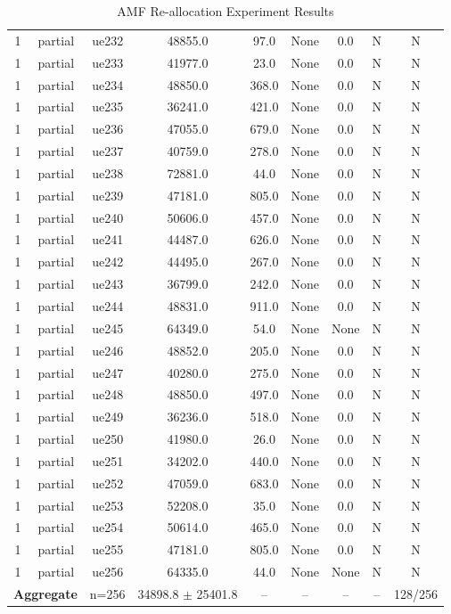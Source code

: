 \begin{table}[ht]
\begin{tabular}{|c|c|c|c|c|c|c|c|c|}
1 & partial & ue232 & 48855.0 & 97.0 & None & 0.0 & N & N \\
1 & partial & ue233 & 41977.0 & 23.0 & None & 0.0 & N & N \\
1 & partial & ue234 & 48850.0 & 368.0 & None & 0.0 & N & N \\
1 & partial & ue235 & 36241.0 & 421.0 & None & 0.0 & N & N \\
1 & partial & ue236 & 47055.0 & 679.0 & None & 0.0 & N & N \\
1 & partial & ue237 & 40759.0 & 278.0 & None & 0.0 & N & N \\
1 & partial & ue238 & 72881.0 & 44.0 & None & 0.0 & N & N \\
1 & partial & ue239 & 47181.0 & 805.0 & None & 0.0 & N & N \\
1 & partial & ue240 & 50606.0 & 457.0 & None & 0.0 & N & N \\
1 & partial & ue241 & 44487.0 & 626.0 & None & 0.0 & N & N \\
1 & partial & ue242 & 44495.0 & 267.0 & None & 0.0 & N & N \\
1 & partial & ue243 & 36799.0 & 242.0 & None & 0.0 & N & N \\
1 & partial & ue244 & 48831.0 & 911.0 & None & 0.0 & N & N \\
1 & partial & ue245 & 64349.0 & 54.0 & None & None & N & N \\
1 & partial & ue246 & 48852.0 & 205.0 & None & 0.0 & N & N \\
1 & partial & ue247 & 40280.0 & 275.0 & None & 0.0 & N & N \\
1 & partial & ue248 & 48850.0 & 497.0 & None & 0.0 & N & N \\
1 & partial & ue249 & 36236.0 & 518.0 & None & 0.0 & N & N \\
1 & partial & ue250 & 41980.0 & 26.0 & None & 0.0 & N & N \\
1 & partial & ue251 & 34202.0 & 440.0 & None & 0.0 & N & N \\
1 & partial & ue252 & 47059.0 & 683.0 & None & 0.0 & N & N \\
1 & partial & ue253 & 52208.0 & 35.0 & None & 0.0 & N & N \\
1 & partial & ue254 & 50614.0 & 465.0 & None & 0.0 & N & N \\
1 & partial & ue255 & 47181.0 & 805.0 & None & 0.0 & N & N \\
1 & partial & ue256 & 64335.0 & 44.0 & None & None & N & N \\
\multicolumn{2}{|c|}{\textbf{Aggregate}} & n=256 & 34898.8 $\pm$ 25401.8 & -- & -- & -- & -- & 128/256 \\
\hline
\end{tabular}
\caption{AMF Re-allocation Experiment Results}
\label{tab:amf_realloc}
\end{table}
